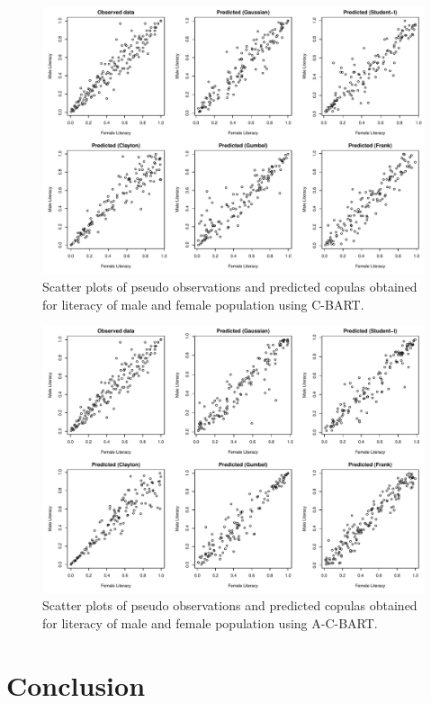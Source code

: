 \documentclass{amsart}
\begin{document}
\begin{figure}
	\centering
	\includegraphics[width = 0.95\linewidth]{"LT_vs_GDP_woa.pdf"}
	\caption{Scatter plots of pseudo observations and predicted copulas obtained for literacy of male and female population using C-BART.}
	\label{fig:pseudo:LT:woa}
\end{figure}

\begin{figure}
	\centering
	\includegraphics[width = 0.95\linewidth]{"LT_vs_GDP_wa.pdf"}
	\caption{Scatter plots of pseudo observations and predicted copulas obtained for literacy of male and female population using A-C-BART.}
	\label{fig:pseudo:LT:wa}
\end{figure}




\section{Conclusion}\label{sec:conc}




\end{document}
